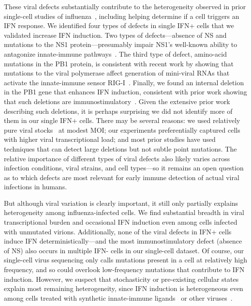 \documentclass[10pt,letterpaper]{article}
\begin{document}
These viral defects substantially contribute to the heterogeneity observed in prior single-cell studies of influenza~\citep{russell2018extreme, steuerman2018dissection, heldt2015single, sjaastad2018distinct}, including helping determine if a cell triggers an IFN response.
We identified four types of defects in single IFN+ cells that we validated increase IFN induction. 
Two types of defects---absence of NS and mutations to the NS1 protein---presumably impair NS1's well-known ability to antagonize innate-immune pathways~\citep{garcia1998influenza, hale2008multifunctional}.
The third type of defect, amino-acid mutations in the PB1 protein, is consistent with recent work by showing that mutations to the viral polymerase affect generation of mini-viral RNAs that activate the innate-immune sensor RIG-I~\citep{velthuis2018mini}.
Finally, we found an internal deletion in the PB1 gene that enhances IFN induction, consistent with prior work showing that such deletions are immunostimulatory~\citep{baum2010preference, tapia2013defective, boergeling2015evidence, dimmock2015cloned}.
Given the extensive prior work describing such deletions, it is perhaps surprising we did not identify more of them in our single IFN+ cells.
There may be several reasons: we used relatively pure viral stocks~\citep{xue2016propagation} at modest MOI; our experiments preferentially captured cells with higher viral transcriptional load; and most prior studies have used techniques that can detect large deletions but not subtle point mutations.
The relative importance of different types of viral defects also likely varies across infection conditions, viral strains, and cell types---so it remains an open question as to which defects are most relevant for early immune detection of actual viral infections in humans.

But although viral variation is clearly important, it still only partially explains heterogeneity among influenza-infected cells.
We find substantial breadth in viral transcriptional burden and occasional IFN induction even among cells infected with unmutated virions.
Additionally, none of the viral defects in IFN+ cells induce IFN deterministically---and the most immunostimulatory defect (absence of NS) also occurs in multiple IFN- cells in our single-cell dataset.
Of course, our single-cell virus sequencing only calls mutations present in a cell at relatively high frequency, and so could overlook low-frequency mutations that contribute to IFN induction.
However, we suspect that stochasticity or pre-existing cellular states explain most remaining heterogeneity, since IFN induction is heterogeneous even among cells treated with synthetic innate-immune ligands~\citep{shalek2013single, shalek2014single, wimmers2018single, bhushal2017cell} or other viruses~\citep{oneal2018west}.
\end{document}
